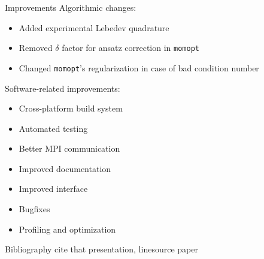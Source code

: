 \documentclass{beamer}
\begin{document}
    \begin{frame}{Improvements}
        Algorithmic changes:
        \begin{itemize}
            \item Added experimental Lebedev quadrature
            \item Removed $\delta$ factor for ansatz correction in \texttt{momopt}
            \item Changed \texttt{momopt}'s regularization in case of bad condition number
        \end{itemize}

        \vfill

        Software-related improvements:
        \begin{itemize}
            \item Cross-platform build system
            \item Automated testing
            \item Better MPI communication
            \item Improved documentation
            \item Improved interface
            \item Bugfixes
            \item Profiling and optimization
        \end{itemize}
    \end{frame}

    \begin{frame}{Bibliography}
        cite that presentation, linesource paper
    \end{frame}
\end{document}
